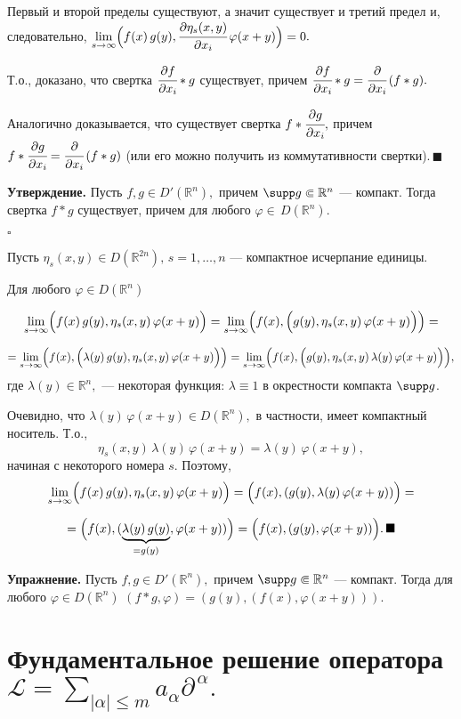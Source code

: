 \documentclass[12pt,a4paper,draft]{article}
\DeclareRobustCommand*{\т}{~--- }
\DeclareRobustCommand*{\ч}{~-- }
\begin{document}
Первый и второй пределы существуют, а значит существует и третий
предел и, следовательно,
$\lim\limits_{s\to\infty}\Bigl(f(x)\,g(y),\cfrac{\partial\eta_s(x,y)}{\partial
x_i}\,\varphi(x+y)\Bigr)=0.$

Т.о., доказано, что свертка $\cfrac{\partial f}{\partial x_i}*g$
существует, причем $\cfrac{\partial f}{\partial
x_i}*g=\cfrac{\partial}{\partial x_i}\,(f*g).$

Аналогично доказывается, что существует свертка $f*\cfrac{\partial
g}{\partial x_i},$ причем $f*\cfrac{\partial g}{\partial
x_i}=\cfrac{\partial}{\partial x_i}\,(f*g)$ (или его можно
получить из коммутативности свертки).$\,\blacksquare$

\textbf{Утверждение.} Пусть $f,g\in D'(\mathbb R^n),$ причем
$\supp g\Subset\mathbb R^n$ --- компакт. Тогда свертка $f*g$
существует, причем для любого $\varphi\in\,D(\mathbb R^n).$

$\square$

Пусть $\eta_s(x,y)\in D(\mathbb R^{2n}),\,s=1,\ldots,n$ ---
компактное исчерпание единицы.

Для любого $\varphi\in D(\mathbb R^n)$

$$\lim\limits_{s\to\infty}\Bigl(f(x)\,g(y),\eta_s(x,y)\,\varphi(x+y)\Bigr)=
\lim\limits_{s\to\infty}\Bigl(f(x),\Bigl(g(y),\eta_s(x,y)\,\varphi(x+y)\Bigr)\Bigr)=$$

$$=\lim\limits_{s\to\infty}\Bigl(f(x),\Bigl(\lambda(y)\,g(y),\eta_s(x,y)\,\varphi(x+y)\Bigr)\Bigr)
=\lim\limits_{s\to\infty}\Bigl(f(x),\Bigl(g(y),\eta_s(x,y)\,\lambda(y)\,\varphi(x+y)\Bigr)\Bigr),$$
где $\lambda(y)\in\mathbb R^n,$ --- некоторая функция:
$\lambda\equiv1$ в окрестности компакта $\supp g$.

Очевидно, что $\lambda(y)\,\varphi(x+y)\in D(\mathbb R^n),$ в
частности, имеет компактный носитель. Т.о.,
$$\eta_s(x,y)\,\lambda(y)\,\varphi(x+y)=\lambda(y)\,\varphi(x+y),$$
начиная с некоторого номера $s$. Поэтому,
$$\lim\limits_{s\to\infty}\Bigl(f(x)\,g(y),\eta_s(x,y)\,\varphi(x+y)\Bigr)
=\Bigl(f(x),(g(y),\lambda(y)\,\varphi(x+y))\Bigr)=$$

$$=\Bigl(f(x),(\underbrace{\lambda(y)\,g(y)}_{=g(y)},\varphi(x+y))\Bigr)=
\Bigl(f(x),(g(y),\varphi(x+y))\Bigr).\,\blacksquare$$

\textbf{Упражнение.} Пусть $f,g\in D'(\mathbb R^n),$ причем $\supp
g\Subset\mathbb R^n$ --- компакт. Тогда для любого $\varphi\in
D(\mathbb R^n)\,\, (f*g,\varphi)=(g(y),(f(x),\varphi(x+y))).$


\section{Фундаментальное решение оператора $\mathcal
L=\sum\limits_{|\alpha|\le m}a_{\alpha}{\partial^{\, \alpha}}.$}
\end{document}
